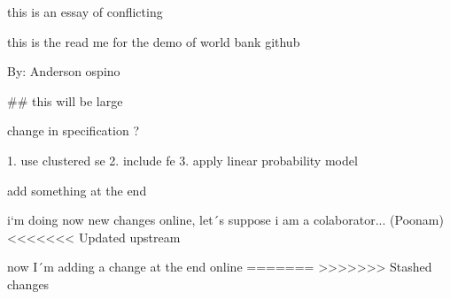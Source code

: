 
this is an essay of conflicting

this is the read me for the demo of world bank github

By: Anderson ospino

## this will be large



change in specification ?

1. use clustered se
2. include fe
3. apply linear probability model

add something at the end


i`m doing now new changes online, let´s suppose i am a colaborator... (Poonam)
<<<<<<< Updated upstream

now I´m adding a change at the end online
=======
>>>>>>> Stashed changes

